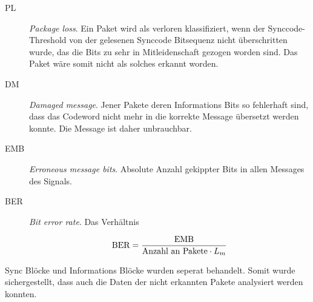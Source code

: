\begin{description}
	
\item[PL] \textit{Package loss}. Ein Paket wird als verloren klassifiziert, wenn der Synccode-Threshold von der gelesenen Synccode Bitsequenz nicht überschritten wurde, das die Bits zu sehr in Mitleidenschaft gezogen worden sind. Das Paket wäre somit nicht als solches erkannt worden. 

\item[DM] \textit{Damaged message}. Jener Pakete deren Informations Bits so fehlerhaft sind, dass das Codeword nicht mehr in die korrekte Message übersetzt werden konnte. Die Message ist daher unbrauchbar.

\item[EMB] \textit{Erroneous message bits}. Absolute Anzahl gekippter Bits in allen Messages des Signals. 

\item[BER] \textit{Bit error rate}. Das Verhältnis 

	\begin{equation}
		\mbox{BER} = {\mbox{EMB} \over \mbox{Anzahl an Pakete} \cdot {L}_{m}}
		\label{equ:ber}
	\end{equation}
\end{description}

Sync Blöcke  und Informations Blöcke wurden seperat behandelt. Somit wurde sichergestellt, dass auch die Daten der nicht erkannten Pakete analysiert werden konnten.  

